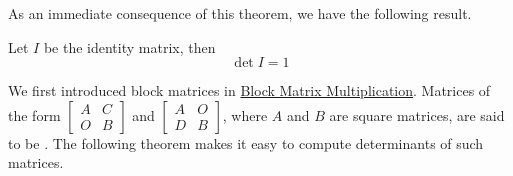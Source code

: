 \documentclass{ximera}
\begin{document}
As an immediate consequence of this theorem, we have the following result.

\begin{corollary}\label{lemma:detofid} Let $I$ be the identity matrix, then
 $$\det{I}=1$$
 \end{corollary}

 We first introduced block matrices in \href{https://ximera.osu.edu/oerlinalg/LinearAlgebra/MAT-0023/main}{Block Matrix Multiplication}.  Matrices of the form $\begin{bmatrix}A & C\\O& B\end{bmatrix}$ and $\begin{bmatrix}A & O\\D& B\end{bmatrix}$, where $A$ and $B$ are square matrices, are said to be .  The following theorem makes it easy to compute determinants of such matrices.
\end{document}
